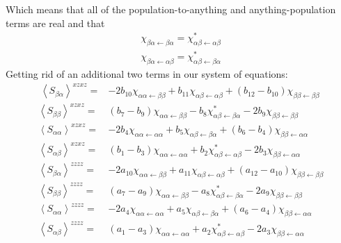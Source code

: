 Which means that all of the population-to-anything and anything-population terms are real and that
\begin{align*}
	\chi_{ \beta \alpha \leftarrow \beta \alpha } = \chi_{\alpha \beta \leftarrow \alpha \beta}^{*} \\
	\chi_{ \beta \alpha \leftarrow \alpha \beta } = \chi_{\alpha \beta \leftarrow \beta \alpha}^{*}
\end{align*}
Getting rid of an additional two terms in our system of equations:
\begin{align*}\
	\left \langle S_{\beta \alpha} \right \rangle^{xzxz} =& - 2 b_{10} \chi_{ \alpha \alpha \leftarrow \beta \beta}   + b_{11} \chi_{ \alpha  \beta\leftarrow \alpha \beta } +\left(  b_{12} - b_{10} \right) \chi_{ \beta \beta \leftarrow \beta \beta } \\
	\left \langle S_{\beta \beta} \right \rangle^{xzxz} =&  \left( b_7 - b_9 \right)   \chi_{ \alpha \alpha \leftarrow \beta \beta } - b_8 \chi_{\alpha \beta \leftarrow \beta \alpha}^{*}  - 2 b_9  \chi_{ \beta \beta \leftarrow \beta \beta} \\
	\left \langle S_{\alpha \alpha} \right \rangle^{xzxz} =& -2  b_4 \chi_{ \alpha \alpha \leftarrow \alpha \alpha}  + b_5 \chi_{\alpha \beta \leftarrow \beta \alpha} + \left( b_6 - b_4 \right) \chi_{\beta \beta \leftarrow \alpha \alpha} \\
	\left \langle S_{\alpha \beta} \right \rangle^{xzxz} =&  \left( b_1 - b_3 \right)  \chi_{\alpha \alpha \leftarrow \alpha \alpha} + b_2 \chi_{\alpha \beta \leftarrow \alpha \beta}^{*}- 2 b_3  \chi_{\beta \beta \leftarrow \alpha \alpha}  \\
	\left \langle S_{\beta \alpha} \right \rangle^{zzzz} =& - 2 a_{10} \chi_{ \alpha \alpha \leftarrow \beta \beta}   + a_{11} \chi_{ \alpha  \beta\leftarrow \alpha \beta } +\left(  a_{12} - a_{10} \right) \chi_{ \beta \beta \leftarrow \beta \beta } \\
	\left \langle S_{\beta \beta} \right \rangle^{zzzz} =&  \left( a_7 - a_9 \right)   \chi_{ \alpha \alpha \leftarrow \beta \beta } - a_8 \chi_{\alpha \beta \leftarrow \beta \alpha}^{*}  - 2 a_9  \chi_{ \beta \beta \leftarrow \beta \beta} \\
	\left \langle S_{\alpha \alpha} \right \rangle^{zzzz} =& -2  a_4 \chi_{ \alpha \alpha \leftarrow \alpha \alpha}  + a_5 \chi_{\alpha \beta \leftarrow \beta \alpha} + \left( a_6 - a_4 \right) \chi_{\beta \beta \leftarrow \alpha \alpha} \\
	\left \langle S_{\alpha \beta} \right \rangle^{zzzz} =&  \left( a_1 - a_3 \right)  \chi_{\alpha \alpha \leftarrow \alpha \alpha} + a_2 \chi_{\alpha \beta \leftarrow \alpha \beta}^{*} - 2 a_3  \chi_{\beta \beta \leftarrow \alpha \alpha}  \\
\end{align*}
